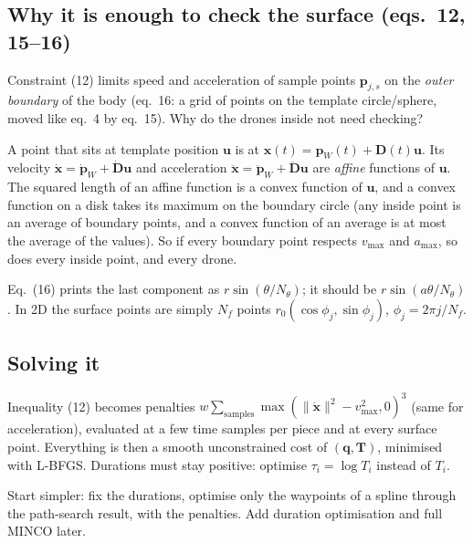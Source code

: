 \documentclass[11pt,a4paper]{article}
\newcommand{\vect}[1]{\mathbf{#1}}
\newcommand{\pW}{\vect{p}_W}
\begin{document}
\subsection{Why it is enough to check the surface (eqs.~12, 15--16)}
Constraint (12) limits speed and acceleration of sample points $\vect{p}_{j,s}$ on the \emph{outer boundary} of the
body (eq.~16: a grid of points on the template circle/sphere, moved like eq.~4 by eq.~15). Why do the drones inside
not need checking?
\begin{whybox}
A point that sits at template position $\vect{u}$ is at $\vect{x}(t)=\pW(t)+\vect{D}(t)\vect{u}$. Its velocity
$\dot{\vect{x}}=\dot{\vect{p}}_W+\dot{\vect{D}}\vect{u}$ and acceleration $\ddot{\vect{x}}=\ddot{\vect{p}}_W+
\ddot{\vect{D}}\vect{u}$ are \emph{affine} functions of $\vect{u}$. The squared length of an affine function is a
convex function of $\vect{u}$, and a convex function on a disk takes its maximum on the boundary circle (any inside
point is an average of boundary points, and a convex function of an average is at most the average of the values).
So if every boundary point respects $v_{\max}$ and $a_{\max}$, so does every inside point, and every drone.
\end{whybox}
\begin{watchbox}
Eq.~(16) prints the last component as $r\sin(\theta/N_\theta)$; it should be $r\sin(a\theta/N_\theta)$. In 2D the
surface points are simply $N_f$ points $r_0(\cos\phi_j,\sin\phi_j)$, $\phi_j=2\pi j/N_f$.
\end{watchbox}

\subsection{Solving it}
Inequality (12) becomes penalties $w\sum_{\text{samples}}\max(\|\dot{\vect{x}}\|^2-v_{\max}^2,0)^3$ (same for
acceleration), evaluated at a few time samples per piece and at every surface point. Everything is then a smooth
unconstrained cost of $(\vect{q},\vect{T})$, minimised with L-BFGS. Durations must stay positive: optimise
$\tau_i=\log T_i$ instead of $T_i$.

\begin{oursbox}
Start simpler: fix the durations, optimise only the waypoints of a spline through the path-search result, with the
penalties. Add duration optimisation and full MINCO later.
\end{oursbox}

\end{document}
